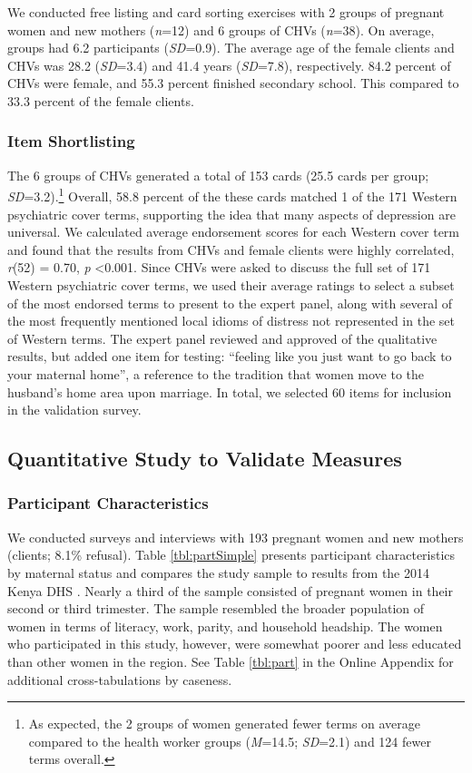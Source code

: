 \documentclass[man,natbib,longtable]{apa6}\usepackage[]{graphicx}\usepackage[]{color}
\begin{document}
We conducted free listing and card sorting exercises with 2 groups of pregnant women and new mothers (\textit{n}=12) and 6 groups of CHVs (\textit{n}=38). On average, groups had 6.2 participants (\textit{SD}=0.9). The average age of the female clients and CHVs was 28.2 (\textit{SD}=3.4) and 41.4 years (\textit{SD}=7.8), respectively. 84.2 percent of CHVs were female, and 55.3 percent finished secondary school. This compared to 33.3 percent of the female clients.

\subsubsection{Item Shortlisting}

The 6 groups of CHVs generated a total of 153 cards (25.5 cards per group; \textit{SD}=3.2).\footnote{As expected, the 2 groups of women generated fewer terms on average compared to the health worker groups (\textit{M}=14.5; \textit{SD}=2.1) and 124 fewer terms overall.} Overall, 58.8 percent of the these cards matched 1 of the 171 Western psychiatric cover terms, supporting the idea that many aspects of depression are universal. We calculated average endorsement scores for each Western cover term and found that the results from CHVs and female clients were highly correlated, \textit{r}(52) = 0.70, \textit{p} <0.001. Since CHVs were asked to discuss the full set of 171 Western psychiatric cover terms, we used their average ratings to select a subset of the most endorsed terms to present to the expert panel, along with several of the most frequently mentioned local idioms of distress not represented in the set of Western terms. The expert panel reviewed and approved of the qualitative results, but added one item for testing: ``feeling like you just want to go back to your maternal home'', a reference to the tradition that women move to the husband's home area upon marriage. In total, we selected 60 items for inclusion in the validation survey.

\subsection{Quantitative Study to Validate Measures}

\subsubsection{Participant Characteristics}

We conducted surveys and interviews with 193 pregnant women and new mothers (clients; 8.1\% refusal). Table \ref{tbl:partSimple} presents participant characteristics by maternal status and compares the study sample to results from the 2014 Kenya DHS \citep{KNBS:2015}. Nearly a third of the sample consisted of pregnant women in their second or third trimester. The sample resembled the broader population of women in terms of literacy, work, parity, and household headship. The women who participated in this study, however, were somewhat poorer and less educated than other women in the region. See Table \ref{tbl:part} in the Online Appendix for additional cross-tabulations by caseness.
\end{document}
